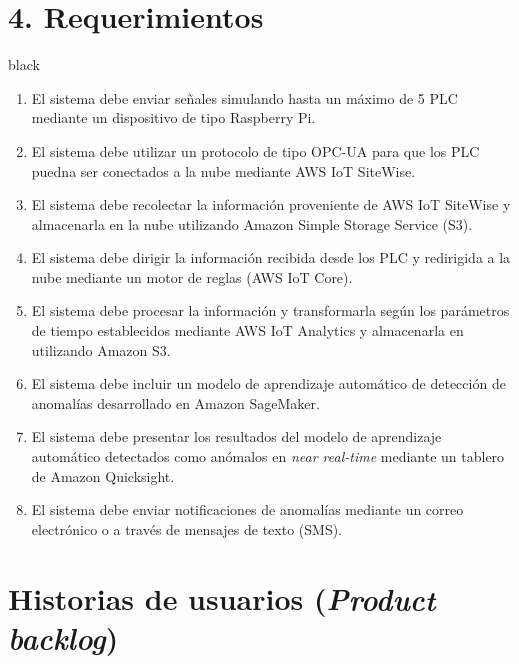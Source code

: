 \documentclass[11pt]{charter}
\begin{document}
\section{4. Requerimientos}
\label{sec:requerimientos}
\begin{consigna}{black}
	\begin{enumerate}
	\item El sistema debe enviar señales simulando hasta un máximo de 5 PLC mediante un dispositivo de tipo Raspberry Pi.
	\item El sistema debe utilizar un protocolo de tipo OPC-UA para que los PLC puedna ser conectados a la nube mediante AWS IoT SiteWise.
	\item El sistema debe recolectar la información proveniente de AWS IoT SiteWise y almacenarla en la nube utilizando Amazon Simple Storage Service (S3).
	\item El sistema debe dirigir la información recibida desde los PLC y redirigida a la nube mediante un motor de reglas (AWS IoT Core).
	\item El sistema debe procesar la información y transformarla según los parámetros de tiempo establecidos mediante AWS IoT Analytics y almacenarla en utilizando Amazon S3.
	\item El sistema debe incluir un modelo de aprendizaje automático de detección de anomalías desarrollado en Amazon SageMaker.
	\item El sistema debe presentar los resultados del modelo de aprendizaje automático detectados como anómalos en \textit{near real-time} mediante un tablero de Amazon Quicksight.
	\item El sistema debe enviar notificaciones de anomalías mediante un correo electrónico o a través de mensajes de texto (SMS).
\end{enumerate}

\end{consigna}

\section{Historias de usuarios (\textit{Product backlog})}
\label{sec:backlog}
\end{document}
